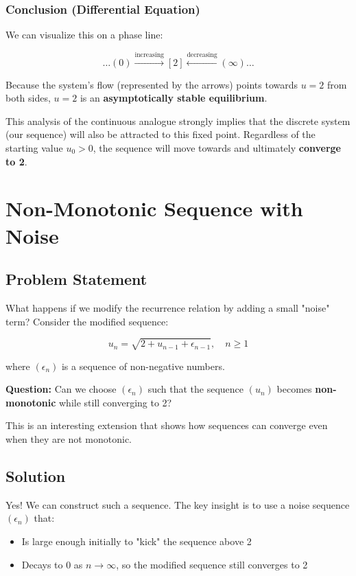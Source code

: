 \documentclass[12pt,a4paper]{article}
\theoremstyle{definition}
\begin{document}
\subsubsection{Conclusion (Differential Equation)}

We can visualize this on a phase line:

\[
\ldots (0) \xrightarrow{\text{increasing}} [2] \xleftarrow{\text{decreasing}} (\infty) \ldots
\]

Because the system's flow (represented by the arrows) points towards $u=2$ from both sides, $u=2$ is an \textbf{asymptotically stable equilibrium}.

This analysis of the continuous analogue strongly implies that the discrete system (our sequence) will also be attracted to this fixed point. Regardless of the starting value $u_0 > 0$, the sequence will move towards and ultimately \textbf{converge to 2}.

\section{Non-Monotonic Sequence with Noise}

\subsection{Problem Statement}

What happens if we modify the recurrence relation by adding a small "noise" term? Consider the modified sequence:

\begin{equation}
u_n = \sqrt{2 + u_{n-1} + \epsilon_{n-1}}, \quad n \geq 1
\end{equation}

where $(\epsilon_n)$ is a sequence of non-negative numbers. 

\textbf{Question:} Can we choose $(\epsilon_n)$ such that the sequence $(u_n)$ becomes \textbf{non-monotonic} while still converging to 2?

This is an interesting extension that shows how sequences can converge even when they are not monotonic.

\subsection{Solution}

Yes! We can construct such a sequence. The key insight is to use a noise sequence $(\epsilon_n)$ that:
\begin{itemize}
    \item Is large enough initially to "kick" the sequence above 2
    \item Decays to 0 as $n \to \infty$, so the modified sequence still converges to 2
\end{itemize}
\end{document}
